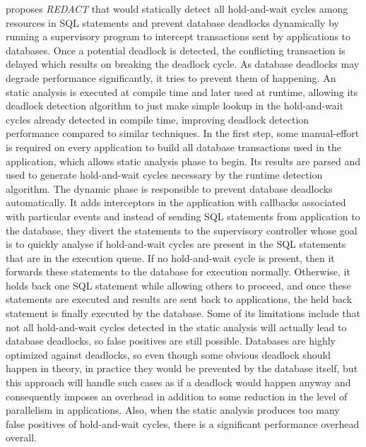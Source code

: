 \citet{grechanik} proposes \emph{REDACT} that would statically detect all hold-and-wait cycles among resources in SQL statements
and prevent database deadlocks dynamically by running a supervisory program to intercept transactions sent by applications to databases.
Once a potential deadlock is detected, the conflicting transaction is delayed which results on breaking the deadlock cycle.
As database deadlocks may degrade performance significantly, it tries to prevent them of happening.
An static analysis is executed at compile time and later used at runtime, allowing its deadlock detection algorithm to just make simple lookup
in the hold-and-wait cycles already detected in compile time, improving deadlock detection performance compared to similar techniques.
In the first step, some manual-effort is required on every application to build all database transactions used in the application,
which allows static analysis phase to begin. Its results are parsed and used to generate hold-and-wait cycles necessary by the runtime detection algorithm.
The dynamic phase is responsible to prevent database deadlocks automatically. It adds interceptors in the application with callbacks associated with particular events and
instead of sending SQL statements from application to the database, they divert the statements to the supervisory controller whose goal is to quickly analyse if
hold-and-wait cycles are present in the SQL statements that are in the execution queue. If no hold-and-wait cycle is present, then it forwards these statements to the
database for execution normally. Otherwise, it holds back one SQL statement while allowing others to proceed,
and once these statements are executed and results are sent back to applications,
the held back statement is finally executed by the database.
Some of its limitations include that not all hold-and-wait cycles detected in the static analysis will actually lead to database deadlocks, so false positives are still possible.
Databases are highly optimized against deadlocks, so even though some obvious deadlock should happen in theory, in practice they would be prevented by the database itself, but
this approach will handle such cases as if a deadlock would happen anyway and consequently imposes an overhead in addition to some reduction in the level of parallelism in applications.
Also, when the static analysis produces too many false positives of hold-and-wait cycles, there is a significant performance overhead overall.

